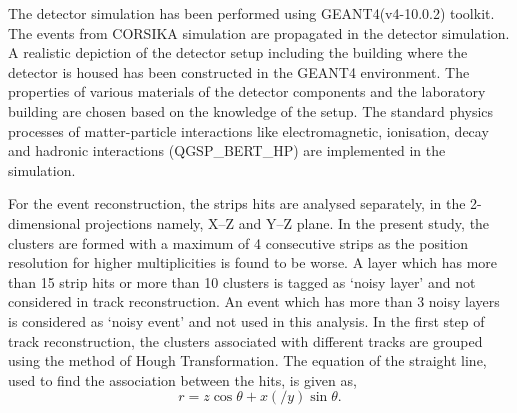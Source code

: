 \documentclass[a4paper,12pt,twoside,openany]{article}
\begin{document}
The detector simulation has been performed using GEANT4(v4-10.0.2) toolkit. The events from CORSIKA simulation are propagated in the detector simulation. A realistic depiction of the detector setup including the building where the detector is housed has been constructed in the GEANT4 environment. The properties of various materials of the detector components and the laboratory building are chosen based on the knowledge of the setup. The standard physics processes of matter-particle interactions like electromagnetic, ionisation, decay and hadronic interactions (QGSP\_BERT\_HP) are implemented in the simulation.

For the event reconstruction, the strips hits are analysed separately, in the 2-dimensional projections namely, \mbox{X--Z} and \mbox{Y--Z} plane. In the present study, the clusters are formed with a maximum of 4 consecutive strips as the position resolution for higher multiplicities is found to be worse. A layer which has more than 15 strip hits or more than 10 clusters is tagged as `noisy layer' and not considered in track reconstruction. An event which has more than 3 noisy layers is considered as `noisy event' and not used in this analysis. In the first step of track reconstruction, the clusters associated with different tracks are grouped using the method of Hough Transformation\cite{hought}. The equation of the straight line, used to find the association between the hits, is given as,
\begin{equation}
  r=z\cos\theta+x\left(/y\right)\sin\theta. \label{eq:hough}
\end{equation}
\end{document}
